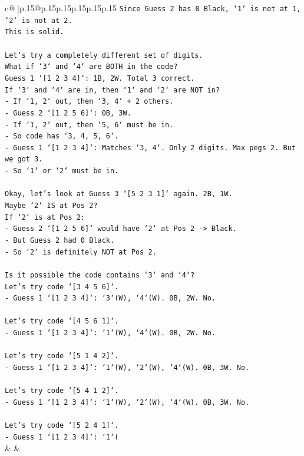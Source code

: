 \documentclass{article}
\begin{document}
{\begin{supertabular}{c@{$\;$}|p{.15\linewidth}@{}p{.15\linewidth}p{.15\linewidth}p{.15\linewidth}p{.15\linewidth}p{.15\linewidth}}
{{{\texttt{Since Guess 2 has 0 Black, `1` is not at 1, `2` is not at 2.} \\
\texttt{This is solid.} \\
\\ 
\texttt{Let's try a completely different set of digits.} \\
\texttt{What if `3` and `4` are BOTH in the code?} \\
\texttt{Guess 1 `{[}1 2 3 4{]}`: 1B, 2W. Total 3 correct.} \\
\texttt{If `3` and `4` are in, then `1` and `2` are NOT in?} \\
\texttt{{-} If `1, 2` out, then `3, 4` + 2 others.} \\
\texttt{{-} Guess 2 `{[}1 2 5 6{]}`: 0B, 3W.} \\
\texttt{{-} If `1, 2` out, then `5, 6` must be in.} \\
\texttt{{-} So code has `3, 4, 5, 6`.} \\
\texttt{{-} Guess 1 `{[}1 2 3 4{]}`: Matches `3, 4`. Only 2 digits. Max pegs 2. But we got 3.} \\
\texttt{{-} So `1` or `2` must be in.} \\
\\ 
\texttt{Okay, let's look at Guess 3 `{[}5 2 3 1{]}` again. 2B, 1W.} \\
\texttt{Maybe `2` IS at Pos 2?} \\
\texttt{If `2` is at Pos 2:} \\
\texttt{{-} Guess 2 `{[}1 2 5 6{]}` would have `2` at Pos 2 {-}> Black.} \\
\texttt{{-} But Guess 2 had 0 Black.} \\
\texttt{{-} So `2` is definitely NOT at Pos 2.} \\
\\ 
\texttt{Is it possible the code contains `3` and `4`?} \\
\texttt{Let's try code `{[}3 4 5 6{]}`.} \\
\texttt{{-} Guess 1 `{[}1 2 3 4{]}`: `3`(W), `4`(W). 0B, 2W. No.} \\
\\ 
\texttt{Let's try code `{[}4 5 6 1{]}`.} \\
\texttt{{-} Guess 1 `{[}1 2 3 4{]}`: `1`(W), `4`(W). 0B, 2W. No.} \\
\\ 
\texttt{Let's try code `{[}5 1 4 2{]}`.} \\
\texttt{{-} Guess 1 `{[}1 2 3 4{]}`: `1`(W), `2`(W), `4`(W). 0B, 3W. No.} \\
\\ 
\texttt{Let's try code `{[}5 4 1 2{]}`.} \\
\texttt{{-} Guess 1 `{[}1 2 3 4{]}`: `1`(W), `2`(W), `4`(W). 0B, 3W. No.} \\
\\ 
\texttt{Let's try code `{[}5 2 4 1{]}`.} \\
\texttt{{-} Guess 1 `{[}1 2 3 4{]}`: `1`(} \\
            }
        }
    }
    & & \\ \\


\end{supertabular}}
\end{document}
